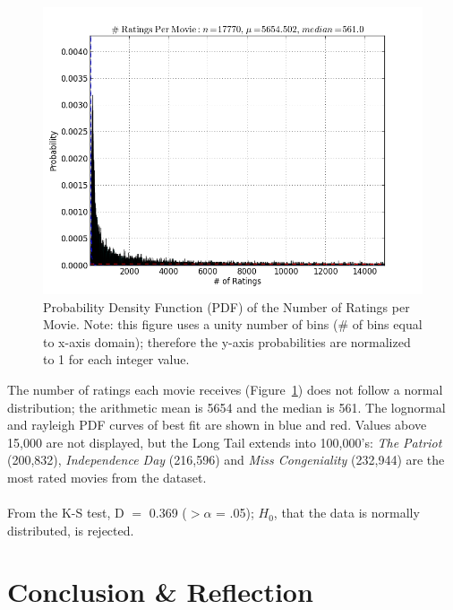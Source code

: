 \documentclass[prodmode,acmtecs]{acmsmall}
\begin{document}
\begin{figure}
\centerline{\includegraphics[scale=.6]{num_ratings_per_movie.png}}
\caption{Probability Density Function (PDF) of the Number of Ratings per Movie. Note: this figure uses a unity number of bins (\# of bins equal to x-axis domain); therefore the y-axis probabilities are normalized to 1 for each integer value.}
\label{fig:six}
\end{figure}

The number of ratings each movie receives (Figure~\ref{fig:six}) does not follow a normal distribution; the arithmetic mean is 5654 and the median is 561. The lognormal and rayleigh PDF curves of best fit are shown in blue and red. Values above 15,000 are not displayed, but the Long Tail extends into 100,000's: \textit{The Patriot} (200,832), \textit{Independence Day} (216,596) and \textit{Miss Congeniality} (232,944) are the most rated movies from the dataset.
\\
\\
From the K-S test, D $=$ 0.369 ($>\alpha$ = .05); $H_0$, that the data is normally distributed, is rejected.
\medskip
\section{Conclusion \& Reflection}
\end{document}
